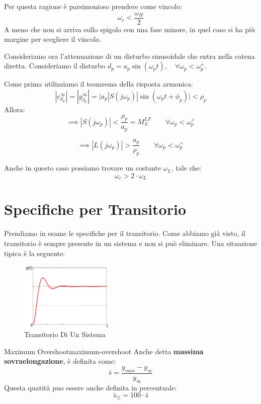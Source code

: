\documentclass[12pt]{article}
\begin{document}
Per questa ragione \`e parsimonioso prendere come vincolo:
\[ \omega_c < \frac{\omega_H}{2}  \]
A meno che non si arriva sullo spigolo con una fase minore, in quel caso si ha pi\`u margine per scegliere il vincolo.

Consideriamo ora l'attenuazione di un disturbo sinusoidale che entra nella catena diretta. Consideriamo il disturbo $d_p = a_p\sin(\omega_pt),\quad \forall \omega_p < \omega_p^{+}$.

Come prima utilizziamo il teomrema della risposta armonica:
\[ |e_{d_p}^{\infty}| = |y _{d_p}^{\infty}| =  \big| a_p|S(j\omega_p)|\sin(\omega_pt + \phi_p) \big| < \rho_p  \]
Allora:
\[ \implies |S(j\omega_p)| < \frac{\rho_p}{a_p} = M_S^{LF} \qquad \forall \omega_p < \omega_p^{+} \]

\[ \implies |L(j\omega_p)| > \frac{a_p}{\rho_p} \qquad \forall \omega_p < \omega_p^{+} \]


Anche in questo caso possiamo trovare un costante $\omega_L$, tale che:
\[ \omega_c > 2\cdot\omega_L \]



\newpage
\section{Specifiche per Transitorio}
Prendiamo in esame le specifiche per il transitorio. Come abbiamo gi\`a visto, il transitorio \`e sempre presente in un sistema e non si pu\`o eliminare. Una situazione tipica \`e la seguente:
\begin{figure}[H]
    \centering
    \includegraphics[width=0.4\textwidth]{transitorio-di-un-sistema.png}
    \caption{Transitorio Di Un Sistema}
    \label{fig:transitorio-di-un-sistema}
\end{figure}

\begin{definition}{Maximum Overshoot}{maximum-overshoot}
    Anche detta \textbf{massima sovraelongazione}, \`e definita come:
    \[ \hat{s} = \frac{y _{max} - y _{\infty}}{ y _{\infty}}  \]
    Questa quatit\`a puo essere anche definita in percentuale:
    \[ \hat{s}_{\%} = 100\cdot \hat{s} \]
\end{definition}
\end{document}
